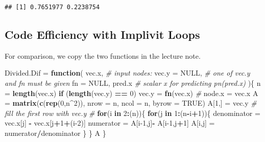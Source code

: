 \documentclass[
]{book}
\newenvironment{Shaded}{\begin{snugshade}}{\end{snugshade}}
\newcommand{\AttributeTok}[1]{\textcolor[rgb]{0.13,0.29,0.53}{#1}}
\newcommand{\CommentTok}[1]{\textcolor[rgb]{0.56,0.35,0.01}{\textit{#1}}}
\newcommand{\ConstantTok}[1]{\textcolor[rgb]{0.56,0.35,0.01}{#1}}
\newcommand{\ControlFlowTok}[1]{\textcolor[rgb]{0.13,0.29,0.53}{\textbf{#1}}}
\newcommand{\DecValTok}[1]{\textcolor[rgb]{0.00,0.00,0.81}{#1}}
\newcommand{\FunctionTok}[1]{\textcolor[rgb]{0.13,0.29,0.53}{\textbf{#1}}}
\newcommand{\NormalTok}[1]{#1}
\newcommand{\OtherTok}[1]{\textcolor[rgb]{0.56,0.35,0.01}{#1}}
\newcommand{\SpecialCharTok}[1]{\textcolor[rgb]{0.81,0.36,0.00}{\textbf{#1}}}
\begin{document}
\begin{verbatim}
## [1] 0.7651977 0.2238754
\end{verbatim}

\hypertarget{code-efficiency-with-implivit-loops}{%
\subsection{Code Efficiency with Implivit Loops}\label{code-efficiency-with-implivit-loops}}

For comparison, we copy the two functions in the lecture note.

\begin{Shaded}
\begin{Highlighting}[]
\NormalTok{Divided.Dif }\OtherTok{=} \ControlFlowTok{function}\NormalTok{(}
\NormalTok{        vec.x,          }\CommentTok{\# input nodes:}
        \AttributeTok{vec.y =} \ConstantTok{NULL}\NormalTok{,   }\CommentTok{\# one of vec.y and fn must be given}
        \AttributeTok{fn =} \ConstantTok{NULL}\NormalTok{,}
\NormalTok{        pred.x          }\CommentTok{\# scalar x for predicting pn(pred.x)}
\NormalTok{         )\{}
\NormalTok{   n }\OtherTok{=} \FunctionTok{length}\NormalTok{(vec.x)}
   \ControlFlowTok{if}\NormalTok{ (}\FunctionTok{length}\NormalTok{(vec.y) }\SpecialCharTok{==} \DecValTok{0}\NormalTok{) vec.y }\OtherTok{=} \FunctionTok{fn}\NormalTok{(vec.x) }\CommentTok{\#}
\NormalTok{   node.x }\OtherTok{=}\NormalTok{ vec.x}
\NormalTok{   A }\OtherTok{=} \FunctionTok{matrix}\NormalTok{(}\FunctionTok{c}\NormalTok{(}\FunctionTok{rep}\NormalTok{(}\DecValTok{0}\NormalTok{,n}\SpecialCharTok{\^{}}\DecValTok{2}\NormalTok{)), }\AttributeTok{nrow =}\NormalTok{ n, }\AttributeTok{ncol =}\NormalTok{ n, }\AttributeTok{byrow =} \ConstantTok{TRUE}\NormalTok{)}
\NormalTok{   A[}\DecValTok{1}\NormalTok{,] }\OtherTok{=}\NormalTok{ vec.y     }\CommentTok{\# fill the first row with vec.y}
   \CommentTok{\#}
   \ControlFlowTok{for}\NormalTok{(i }\ControlFlowTok{in} \DecValTok{2}\SpecialCharTok{:}\NormalTok{(n))\{}
     \ControlFlowTok{for}\NormalTok{(j }\ControlFlowTok{in} \DecValTok{1}\SpecialCharTok{:}\NormalTok{(n}\SpecialCharTok{{-}}\NormalTok{i}\SpecialCharTok{+}\DecValTok{1}\NormalTok{))\{}
\NormalTok{      denominator }\OtherTok{=}\NormalTok{ vec.x[j] }\SpecialCharTok{{-}}\NormalTok{ vec.x[j}\SpecialCharTok{+}\DecValTok{1}\SpecialCharTok{+}\NormalTok{(i}\DecValTok{{-}2}\NormalTok{)]}
\NormalTok{      numerator }\OtherTok{=}\NormalTok{ A[i}\DecValTok{{-}1}\NormalTok{,j]}\SpecialCharTok{{-}}\NormalTok{ A[i}\DecValTok{{-}1}\NormalTok{,j}\SpecialCharTok{+}\DecValTok{1}\NormalTok{]}
\NormalTok{      A[i,j] }\OtherTok{=}\NormalTok{ numerator}\SpecialCharTok{/}\NormalTok{denominator}
\NormalTok{      \}}
\NormalTok{    \}}
\NormalTok{  A}
\NormalTok{ \}}
\end{Highlighting}
\end{Shaded}
\end{document}
